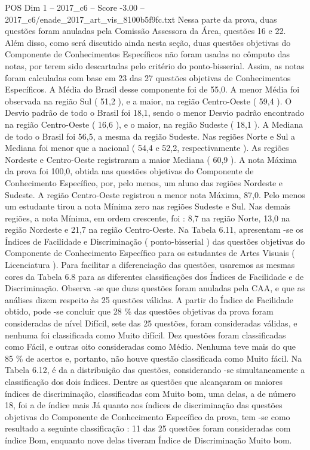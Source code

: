 \begin{textsample}{POS Dim 1 – 2017\_c6 – Score -3.00 – 2017\_c6/enade\_2017\_art\_vis\_8100b5f9fc.txt}
Nessa parte da prova, duas questões foram anuladas pela Comissão Assessora da Área, questões 16 e 22.
Além disso, como será discutido ainda nesta seção, duas questões objetivas do Componente de Conhecimentos Específicos não foram usadas no cômputo das notas, por terem sido descartadas pelo critério do ponto-bisserial.
Assim, as notas foram calculadas com base em 23 das 27 questões objetivas de Conhecimentos Específicos.
A Média do Brasil desse componente foi de 55,0.
A menor Média foi observada na região Sul ( 51,2 ), e a maior, na região Centro-Oeste ( 59,4 ).
O Desvio padrão de todo o Brasil foi 18,1, sendo o menor Desvio padrão encontrado na região Centro-Oeste ( 16,6 ), e o maior, na região Sudeste ( 18,1 ).
A Mediana de todo o Brasil foi 56,5, a mesma da região Sudeste.
Nas regiões Norte e Sul a Mediana foi menor que a nacional ( 54,4 e 52,2, respectivamente ).
As regiões Nordeste e Centro-Oeste registraram a maior Mediana ( 60,9 ).
A nota Máxima da prova foi 100,0, obtida nas questões objetivas do Componente de Conhecimento Específico, por, pelo menos, um aluno das regiões Nordeste e Sudeste.
A região Centro-Oeste registrou a menor nota Máxima, 87,0.
Pelo menos um estudante tirou a nota Mínima zero nas regiões Sudeste e Sul.
Nas demais regiões, a nota Mínima, em ordem crescente, foi : 8,7 na região Norte, 13,0 na região Nordeste e 21,7 na região Centro-Oeste.
Na Tabela 6.11, apresentam -se os Índices de Facilidade e Discriminação ( ponto-bisserial ) das questões objetivas do Componente de Conhecimento Específico para os estudantes de Artes Visuais ( Licenciatura ).
Para facilitar a diferenciação das questões, usaremos as mesmas cores da Tabela 6.8 para as diferentes classificações dos Índices de Facilidade e de Discriminação.
Observa -se que duas questões foram anuladas pela CAA, e que as análises dizem respeito às 25 questões válidas.
A partir do Índice de Facilidade obtido, pode -se concluir que 28 \% das questões objetivas da prova foram consideradas de nível Difícil, sete das 25 questões, foram consideradas válidas, e nenhuma foi classificada como Muito difícil.
Dez questões foram classificadas como Fácil, e outras oito consideradas como Médio.
Nenhuma teve mais do que 85 \% de acertos e, portanto, não houve questão classificada como Muito fácil.
Na Tabela 6.12, é da a distribuição das questões, considerando -se simultaneamente a classificação dos dois índices.
Dentre as questões que alcançaram os maiores índices de discriminação, classificadas com Muito bom, uma delas, a de número 18, foi a de índice mais Já quanto aos índices de discriminação das questões objetivas do Componente de Conhecimento Específico da prova, tem -se como resultado a seguinte classificação : 11 das 25 questões foram consideradas com índice Bom, enquanto nove delas tiveram Índice de Discriminação Muito bom.

\end{textsample}

